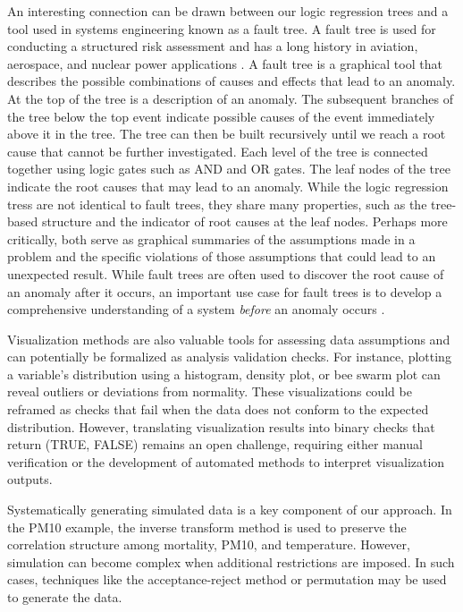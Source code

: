 \documentclass[
  12pt,
]{interact}
\begin{document}
An interesting connection can be drawn between our logic regression
trees and a tool used in systems engineering known as a fault tree. A
fault tree is used for conducting a structured risk assessment and has a
long history in aviation, aerospace, and nuclear power applications
\citep{vesely1981fault}. A fault tree is a graphical tool that describes
the possible combinations of causes and effects that lead to an anomaly.
At the top of the tree is a description of an anomaly. The subsequent
branches of the tree below the top event indicate possible causes of the
event immediately above it in the tree. The tree can then be built
recursively until we reach a root cause that cannot be further
investigated. Each level of the tree is connected together using logic
gates such as AND and OR gates. The leaf nodes of the tree indicate the
root causes that may lead to an anomaly. While the logic regression
tress are not identical to fault trees, they share many properties, such
as the tree-based structure and the indicator of root causes at the leaf
nodes. Perhaps more critically, both serve as graphical summaries of the
assumptions made in a problem and the specific violations of those
assumptions that could lead to an unexpected result. While fault trees
are often used to discover the root cause of an anomaly after it occurs,
an important use case for fault trees is to develop a comprehensive
understanding of a system \emph{before} an anomaly occurs
\citep{michael2002fault}.

Visualization methods are also valuable tools for assessing data
assumptions and can potentially be formalized as analysis validation
checks. For instance, plotting a variable's distribution using a
histogram, density plot, or bee swarm plot can reveal outliers or
deviations from normality. These visualizations could be reframed as
checks that fail when the data does not conform to the expected
distribution. However, translating visualization results into binary
checks that return (TRUE, FALSE) remains an open challenge, requiring
either manual verification or the development of automated methods to
interpret visualization outputs.

Systematically generating simulated data is a key component of our
approach. In the PM10 example, the inverse transform method is used to
preserve the correlation structure among mortality, PM10, and
temperature. However, simulation can become complex when additional
restrictions are imposed. In such cases, techniques like the
acceptance-reject method or permutation may be used to generate the
data.
\end{document}
